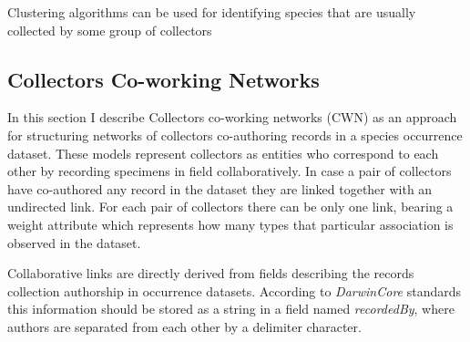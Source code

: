 \documentclass[a4paper]{article}
\begin{document}
Clustering algorithms can be used for identifying species that are usually collected by some group of collectors  




\subsection{Collectors Co-working Networks}





In this section I describe Collectors co-working networks (CWN) as an approach for structuring networks of collectors co-authoring records in a species occurrence dataset. 
These models represent collectors as entities who correspond to each other by recording specimens in field collaboratively. 
In case a pair of collectors have co-authored any record in the dataset they are linked together with an undirected link.
For each pair of collectors there can be only one link, bearing a weight attribute which represents how many types that particular association is observed in the dataset.

Collaborative links are directly derived from fields describing the records collection authorship in occurrence datasets. 
According to \textit{DarwinCore} standards \cite{} this information should be stored as a string in a field named \textit{recordedBy}, where authors are separated from each other by a delimiter character.
\end{document}
